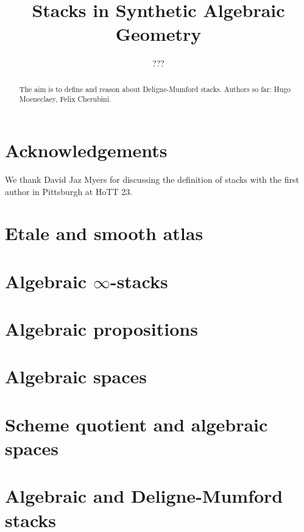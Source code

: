 \documentclass{../util/zariski}
\title{Stacks in Synthetic Algebraic Geometry}
\author{???}
\begin{document}
\maketitle

\begin{abstract}
  The aim is to define and reason about Deligne-Mumford stacks.
  Authors so far: Hugo Moeneclaey, Felix Cherubini.
\end{abstract}

\section*{Acknowledgements}
We thank David Jaz Myers for discussing the definition of stacks with the first author in Pittsburgh at HoTT 23.

\tableofcontents

\section{Etale and smooth atlas}


\section{Algebraic $\infty$-stacks}


\section{Algebraic propositions}


\section{Algebraic spaces}


\section{Scheme quotient and algebraic spaces}


\section{Algebraic and Deligne-Mumford stacks}



\printindex

\printbibliography
\end{document}
